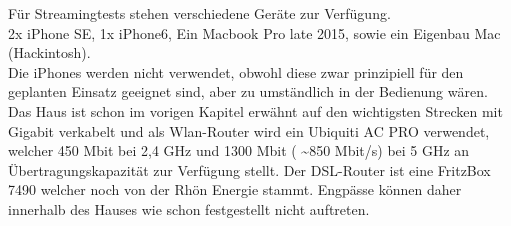 
Für Streamingtests stehen verschiedene Geräte zur Verfügung.\\

2x iPhone SE, 1x iPhone6, Ein Macbook Pro  late 2015, sowie ein Eigenbau Mac (Hackintosh).\\
Die iPhones werden nicht verwendet, obwohl diese zwar prinzipiell für den geplanten Einsatz geeignet sind, aber zu umständlich in der Bedienung wären.\\

Das Haus ist schon im vorigen Kapitel erwähnt auf den wichtigsten Strecken mit Gigabit verkabelt und als Wlan-Router wird ein Ubiquiti AC PRO verwendet,
welcher 450 Mbit bei 2,4 GHz und 1300 Mbit ( \textasciitilde 850 Mbit/s) bei 5 GHz an Übertragungskapazität zur Verfügung stellt.
Der DSL-Router ist eine FritzBox 7490 welcher noch von der Rhön Energie stammt.
Engpässe können daher innerhalb des Hauses wie schon festgestellt nicht auftreten.



